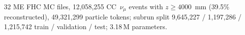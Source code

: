 32 ME FHC MC files, 12{,}058{,}255 CC~$\nu_\mu$ events with $z \ge 4000$~mm (39.5\% reconstructed), 49{,}321{,}299 particle tokens; subrun split 9{,}645{,}227 / 1{,}197{,}286 / 1{,}215{,}742 train / validation / test; 3.18\,M parameters.
